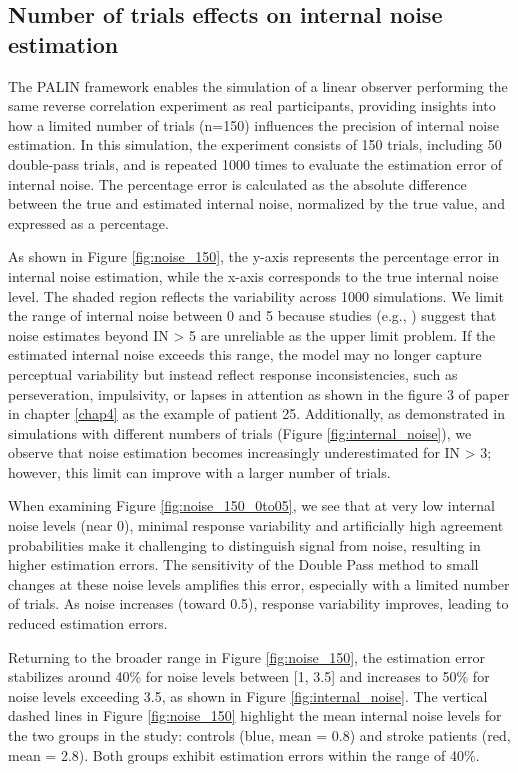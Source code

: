 \subsection{Number of trials effects on internal noise estimation}
The PALIN framework enables the simulation of a linear observer performing the same reverse correlation experiment as real participants, providing insights into how a limited number of trials (n=150) influences the precision of internal noise estimation. In this simulation, the experiment consists of 150 trials, including 50 double-pass trials, and is repeated 1000 times to evaluate the estimation error of internal noise. The percentage error is calculated as the absolute difference between the true and estimated internal noise, normalized by the true value, and expressed as a percentage.

As shown in Figure \ref{fig:noise_150}, the y-axis represents the percentage error in internal noise estimation, while the x-axis corresponds to the true internal noise level. The shaded region reflects the variability across 1000 simulations. We limit the range of internal noise between 0 and 5 because studies (e.g., \cite{neri_how_2010}) suggest that noise estimates beyond IN > 5 are unreliable as the upper limit problem. If the estimated internal noise exceeds this range, the model may no longer capture perceptual variability  but instead reflect response inconsistencies, such as perseveration, impulsivity, or lapses in attention as shown in the figure 3 of paper in chapter \ref{chap4} as the example of patient 25. Additionally, as demonstrated in simulations with different numbers of trials (Figure \ref{fig:internal_noise}), we observe that noise estimation becomes increasingly underestimated for IN > 3; however, this limit can improve with a larger number of trials.

When examining Figure \ref{fig:noise_150_0to05}, we see that at very low internal noise levels (near 0), minimal response variability and artificially high agreement probabilities make it challenging to distinguish signal from noise, resulting in higher estimation errors. The sensitivity of the Double Pass method to small changes at these noise levels amplifies this error, especially with a limited number of trials. As noise increases (toward 0.5), response variability improves, leading to reduced estimation errors.

Returning to the broader range in Figure \ref{fig:noise_150}, the estimation error stabilizes around 40\% for noise levels between [1, 3.5] and increases to 50\% for noise levels exceeding 3.5, as shown in Figure \ref{fig:internal_noise}. The vertical dashed lines in Figure \ref{fig:noise_150} highlight the mean internal noise levels for the two groups in the study: controls (blue, mean = 0.8) and stroke patients (red, mean = 2.8). Both groups exhibit estimation errors within the range of 40\%.

